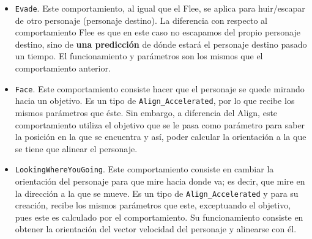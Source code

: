 \begin{itemize}
 \item \texttt{Evade}. Este comportamiento, al igual que el Flee, se aplica para huir/escapar de otro personaje (personaje destino). La diferencia con respecto al comportamiento Flee es que en este caso no escapamos del propio personaje destino, sino de \textbf{una predicción} de dónde estará el personaje destino pasado un tiempo. El funcionamiento y parámetros son los mismos que el comportamiento anterior.
 
 \item \texttt{Face}. Este comportamiento consiste hacer que el personaje se quede mirando hacia un objetivo. Es un tipo de \texttt{Align\_Accelerated}, por lo que recibe los mismos parámetros que éste. Sin embargo, a diferencia del Align, este comportamiento utiliza el objetivo que se le pasa como parámetro para saber la posición en la que se encuentra y así, poder calcular la orientación a la que se tiene que alinear el personaje.
 
 \item \texttt{LookingWhereYouGoing}. Este comportamiento consiste en cambiar la orientación del personaje para que mire hacia donde va; es decir, que mire en la dirección a la que se mueve. Es un tipo de \texttt{Align\_Accelerated} y para su creación, recibe los mismos parámetros que este, exceptuando el objetivo, pues este es calculado por el comportamiento. Su funcionamiento consiste en obtener la orientación del vector velocidad del personaje y alinearse con él.
 

\end{itemize}
